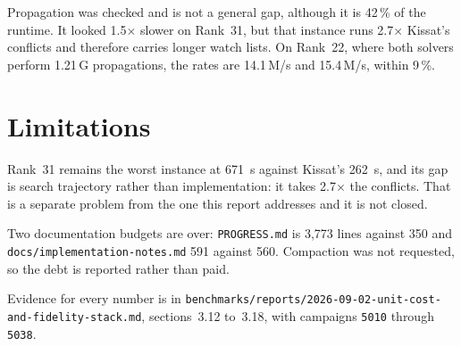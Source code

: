 \documentclass[11pt]{article}
\newcommand{\code}[1]{\texttt{#1}}
\begin{document}
Propagation was checked and is not a general gap, although it is 42\,\% of the
runtime. It looked 1.5$\times$ slower on Rank~31, but that instance runs
2.7$\times$ Kissat's conflicts and therefore carries longer watch lists. On
Rank~22, where both solvers perform 1.21\,G propagations, the rates are
14.1\,M/s and 15.4\,M/s, within 9\,\%.

\section{Limitations}

Rank~31 remains the worst instance at 671~s against Kissat's 262~s, and its gap
is search trajectory rather than implementation: it takes 2.7$\times$ the
conflicts. That is a separate problem from the one this report addresses and it
is not closed.

Two documentation budgets are over: \code{PROGRESS.md} is 3{,}773 lines against
350 and \code{docs/implementation-notes.md} 591 against 560. Compaction was not
requested, so the debt is reported rather than paid.

Evidence for every number is in
\code{benchmarks/reports/2026-09-02-unit-cost-and-fidelity-stack.md},
sections~3.12 to~3.18, with campaigns \code{5010} through \code{5038}.
\end{document}
